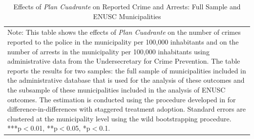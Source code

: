 \begin{table}[h!]
\caption{Effects of \emph{Plan Cuadrante} on Reported Crime and Arrests: Full Sample and ENUSC Municipalities}
\label{tab:SPD_all_vs_enusc}
\begin{center}
\par{
\begin{tabular}{p{12cm}}
\footnotesize{Note: This table shows the effects of \emph{Plan Cuadrante} on the number of crimes reported to the police in the municipality per 100,000 inhabitants and on the number of arrests in the municipality per 100,000 inhabitants using administrative data from the Undersecretary for Crime Prevention. The table reports the results for two samples: the full sample of municipalities included in the administrative database that is used for the analysis of these outcomes and the subsample of these municipalities included in the analysis of ENUSC outcomes. The estimation is conducted using the procedure developed in \citet{Callaway} for difference-in-differences with staggered treatment adoption. Standard errors are clustered at the municipality level using the wild bootstrapping procedure. ***p$<$0.01, **p$<$0.05, *p$<$0.1.} \\
\end{tabular}}
\end{center}
\end{table}

